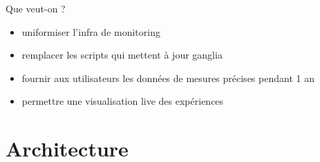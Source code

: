 \documentclass{beamer}
\begin{document}
\begin{frame}{Que veut-on ?}
\begin{itemize}
  \item uniformiser l'infra de monitoring
  \item remplacer les scripts qui mettent à jour ganglia
  \item fournir aux utilisateurs les données de mesures précises pendant 1 an
  \item permettre une visualisation live des expériences
\end{itemize}
\end{frame}



\section{Architecture}
\end{document}
